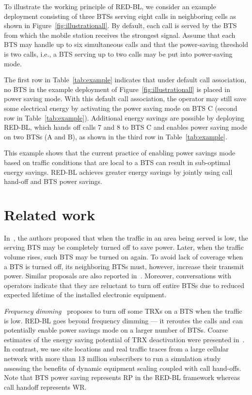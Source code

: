 To illustrate the working principle of RED-BL, we consider an example deployment consisting of three BTSs serving eight calls in neighboring cells as shown in Figure~\ref{fig:illustrationall}.
By default, each call is served by the BTS from which the mobile station receives the strongest signal. Assume that each BTS may handle up to six simultaneous calls and that the power-saving threshold is two calls, i.e., a BTS serving up to two calls may be put into power-saving mode.

The first row in Table~\ref{tab:example} indicates that under default call association, no BTS in the example deployment of Figure~\ref{fig:illustrationall} is placed in power saving mode.
With this default call association, the operator may still save some electrical energy by activating the power saving mode on BTS C (second row in Table~\ref{tab:example}).
Additional energy savings are possible by deploying RED-BL, which hands off calls 7 and 8 to BTS C and enables power saving mode on two BTSs (A and B), as shown in the third row in Table~\ref{tab:example}.


This example shows that the current practice of enabling power savings mode based on traffic conditions that are local to a BTS can result in sub-optimal energy savings.
RED-BL achieves greater energy savings by jointly using call hand-off and BTS power savings.

\section{Related work}
\label{sec:related}

In~\cite{Peng:2011:BTSSaving:Mobicom}, the authors proposed that when the traffic in an area being served is low, the serving BTS may be completely turned off to save power. Later, when the traffic volume rises, such BTS may be turned on again. To avoid lack of coverage when a BTS is turned off, its neighboring BTSs must, however, increase their transmit power.
Similar proposals are also reported in~\cite{Oh:TWC:2013,6503647,Oh:Globecom:2010,5208045,Oh:Comm:2011,marsan:wgreen:2008}. Moreover, conversations with operators indicate that they are reluctant to turn off entire BTSs due to reduced expected lifetime of the installed electronic equipment.

\textit{Frequency dimming}~\cite{Tipper:Dimming:Globecom:2010} proposes to turn off some TRXs on a BTS when the traffic is low. RED-BL goes beyond frequency dimming --- it reroutes the calls and can potentially enable power savings mode on a larger number of BTSs.
Coarse estimates of the energy saving potential of TRX deactivation were presented
in~\cite{Blume:2010:BLTJ:CellularPower}.
In contrast, we use site locations and real traffic traces from a large cellular network with more than 13 million subscribers to run a simulation study assessing the benefits of dynamic equipment scaling coupled
with call hand-offs. Note that BTS power saving represents RP in the RED-BL framework whereas call handoff represents WR.

